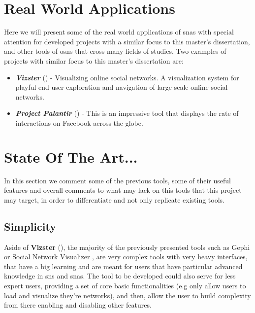 \section{Real World Applications}
Here we will present some of the real world applications of \glspl{sna} with special attention for developed projects with a similar focus to this master's dissertation, and other tools of \glspl{osn} that cross many fields of studies. Two examples of projects with similar focus to this master's dissertation are:

\begin{itemize}
    \item \textit{\textbf{Vizster}} (\cite{heer2005vizster}) - Visualizing online social networks. A visualization system for playful end-user exploration and navigation of large-scale online social networks.
    \item \textit{\textbf{Project Palantir}} (\cite{project-palantir}) - This is an impressive tool that displays the rate of interactions on Facebook across the globe.
\end{itemize}


\section{State Of The Art...}

In this section we comment some of the previous tools, some of their useful features and overall comments to what may lack on this tools that this project may target, in order to differentiate and not only replicate existing tools.\\

\subsection*{Simplicity}
Aside of \textbf{Vizster} (\cite{heer2005vizster}), the majority of the previously presented tools such as Gephi \cite{bastian2009gephi} or Social Network Visualizer \cite{socnetv}, are very complex tools with very heavy interfaces, that have a big learning and are meant for users that have particular advanced knowledge in \glspl{sn} and \glspl{sna}. The tool to be developed could also serve for less expert users, providing a set of core basic functionalities (e.g only allow users to load and visualize they're networks), and then, allow the user to build complexity from there enabling and disabling other features.

